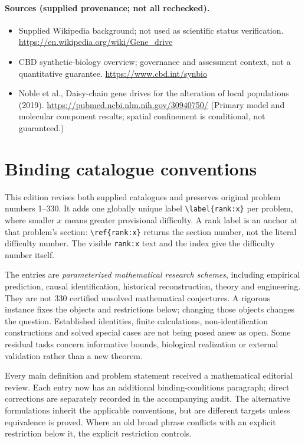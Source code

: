 \documentclass[11pt]{article}
\begin{document}
\paragraph{Sources (supplied provenance; not all rechecked).} \begin{itemize}
\item Supplied Wikipedia background; not used as scientific status verification. \url{https://en.wikipedia.org/wiki/Gene_drive}
\item CBD synthetic-biology overview; governance and assessment context, not a quantitative guarantee. \url{https://www.cbd.int/synbio}
\item Noble et al., Daisy-chain gene drives for the alteration of local populations (2019). \url{https://pubmed.ncbi.nlm.nih.gov/30940750/} (Primary model and molecular component results; spatial confinement is conditional, not guaranteed.)
\end{itemize}


\section*{Binding catalogue conventions}
This edition revises both supplied catalogues and preserves original problem numbers 1--330. It adds one globally unique label \verb|\label{rank:x}| per problem, where smaller $x$ means greater provisional difficulty. A rank label is an anchor at that problem's section: \verb|\ref{rank:x}| returns the section number, not the literal difficulty number. The visible \texttt{rank:x} text and the index give the difficulty number itself.

The entries are \emph{parameterized mathematical research schemes}, including empirical prediction, causal identification, historical reconstruction, theory and engineering. They are not 330 certified unsolved mathematical conjectures. A rigorous instance fixes the objects and restrictions below; changing those objects changes the question. Established identities, finite calculations, non-identification constructions and solved special cases are not being posed anew as open. Some residual tasks concern informative bounds, biological realization or external validation rather than a new theorem.

Every main definition and problem statement received a mathematical editorial review. Each entry now has an additional binding-conditions paragraph; direct corrections are separately recorded in the accompanying audit. The alternative formulations inherit the applicable conventions, but are different targets unless equivalence is proved. Where an old broad phrase conflicts with an explicit restriction below it, the explicit restriction controls.
\end{document}
